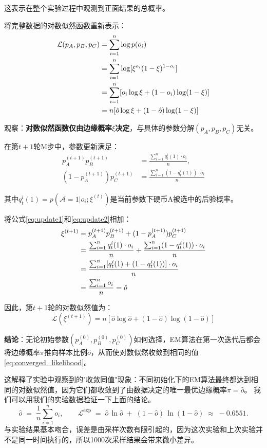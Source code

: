 \documentclass[12pt,a4paper]{article}
\begin{document}
这表示在整个实验过程中观测到正面结果的总概率。

将完整数据的对数似然函数重新表示：
\begin{align}
\mathcal{L}(p_A, p_B, p_C) &= \sum_{i=1}^n \log p(o_i) \notag \\
&= \sum_{i=1}^n \log[\xi ^{o_i}(1-\xi )^{1-o_i}] \notag \\
&= \sum_{i=1}^n [o_i \log \xi  + (1-o_i) \log(1-\xi )] \notag \\
&= n[\hat{o} \log \xi + (1-\hat{o}) \log(1-\xi )]
\label{eq:likelihood_marginal}
\end{align}

观察：\textbf{对数似然函数仅由边缘概率$\xi $决定}，与具体的参数分解$(p_A, p_B, p_C)$无关。

在第$t+1$轮M步中，参数更新满足：
\begin{align}
p_A^{(t+1)} p_B^{(t+1)} &= \frac{\sum_{i=1}^n q_t^i(1) \cdot o_i}{n}, \label{eq:update1} \\
(1-p_A^{(t+1)}) p_C^{(t+1)} &= \frac{\sum_{i=1}^n (1-q_t^i(1)) \cdot o_i}{n} \label{eq:update2}
\end{align}

其中$q_t^i(1) = p(\mathcal{A}=1|o_i; \xi ^{(t)})$是当前参数下硬币A被选中的后验概率。

将公式\ref{eq:update1}和\ref{eq:update2}相加：
\begin{align}
\xi ^{(t+1)} &= p_A^{(t+1)} p_B^{(t+1)} + (1-p_A^{(t+1)}) p_C^{(t+1)} \notag \\
&= \frac{\sum_{i=1}^n q_t^i(1) \cdot o_i}{n} + \frac{\sum_{i=1}^n (1-q_t^i(1)) \cdot o_i}{n} \notag \\
&= \frac{\sum_{i=1}^n [q_t^i(1) + (1-q_t^i(1))] \cdot o_i}{n} \notag \\
&= \frac{\sum_{i=1}^n o_i}{n} = \hat{o}
\label{eq:pi_convergence}
\end{align}

因此，第$t+1$轮的对数似然值为：
\begin{equation}
\mathcal{L}(\xi ^{(t+1)}) = n[\hat{o} \log \hat{o} + (1-\hat{o}) \log(1-\hat{o})]
\label{eq:converged_likelihood}
\end{equation}

\textbf{结论}：无论初始参数$(p_A^{(0)}, p_B^{(0)}, p_C^{(0)})$如何选择，EM算法在第一次迭代后都会将边缘概率$\pi$推向样本比例$\hat{o}$，从而使对数似然收敛到相同的值\eqref{eq:converged_likelihood}。

这解释了实验中观察到的"收敛同值"现象：不同初始化下的EM算法最终都达到相同的对数似然值，因为它们都收敛到了由数据决定的唯一最优边缘概率$\pi = \hat{o}$。
我们可以用我们的实验数据验证一下上面的结论。
\[
\hat{o} \;=\; \frac{1}{n}\sum_{i=1}^n o_i,
\qquad
\mathcal{L}^{\mathrm{exp}}
\;=\;
\hat{o}\,\ln\hat{o} \;+\;(1-\hat{o})\,\ln(1-\hat{o})
\;\approx\;-0.6551.
\]
与实验结果基本吻合，误差是由采样次数有限引起的，因为这次实验和上次实验并不是同一时间执行的，所以1000次采样结果会带来微小差异。
\end{document}
